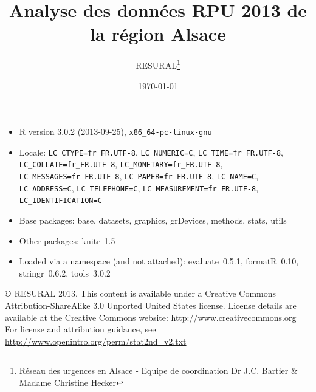 \documentclass[12pt,english,french,twoside]{report}\usepackage[]{graphicx}\usepackage[]{color}
\begin{document}

\title{Analyse des données RPU 2013 de la région Alsace}
\author{RESURAL\thanks{Réseau des urgences en Alsace - Equipe de coordination Dr J.C.
Bartier \& Madame Christine Hecker}}
\date{\today}
\maketitle


\newpage
\chapter*{}
\vfill

\begin{itemize}\raggedright
  \item R version 3.0.2 (2013-09-25), \verb|x86_64-pc-linux-gnu|
  \item Locale: \verb|LC_CTYPE=fr_FR.UTF-8|, \verb|LC_NUMERIC=C|, \verb|LC_TIME=fr_FR.UTF-8|, \verb|LC_COLLATE=fr_FR.UTF-8|, \verb|LC_MONETARY=fr_FR.UTF-8|, \verb|LC_MESSAGES=fr_FR.UTF-8|, \verb|LC_PAPER=fr_FR.UTF-8|, \verb|LC_NAME=C|, \verb|LC_ADDRESS=C|, \verb|LC_TELEPHONE=C|, \verb|LC_MEASUREMENT=fr_FR.UTF-8|, \verb|LC_IDENTIFICATION=C|
  \item Base packages: base, datasets, graphics, grDevices,
    methods, stats, utils
  \item Other packages: knitr~1.5
  \item Loaded via a namespace (and not attached): evaluate~0.5.1,
    formatR~0.10, stringr~0.6.2, tools~3.0.2
\end{itemize}




\noindent $\copyright$ RESURAL 2013. This content is available under a Creative Commons Attribution-ShareAlike 3.0 Unported United States license. License details are available at the Creative Commons website: \url{http://www.creativecommons.org} \\

\noindent For license and attribution guidance, see \url{http://www.openintro.org/perm/stat2nd_v2.txt}


\tableofcontents
\listoftables
\listoffigures
\end{document}
